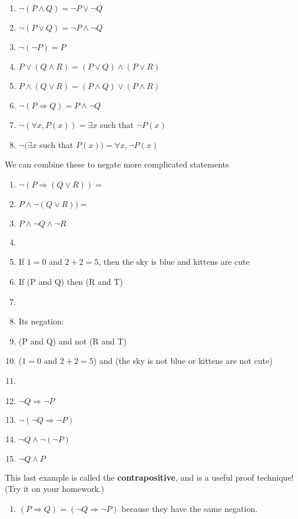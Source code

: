 \documentclass[12pt, reqno]{amsart}
\begin{document}
\begin{enumerate}
\item $\neg(P \wedge Q) = \neg P \vee \neg Q$
\item $\neg(P \vee Q) = \neg P \wedge \neg Q$
\item $\neg(\neg P) = P$
\item $P \vee (Q \wedge R) = (P \vee Q) \wedge (P \vee R)$
\item $P \wedge (Q \vee R) = (P \wedge Q) \vee (P \wedge R)$
\item $\neg (P \Rightarrow Q) = P \wedge \neg Q$
\item $\neg (\forall x, P(x)) = \exists x$  such that $\neg P(x)$
\item $\neg (\exists x$ such that $P(x)) = \forall x, \neg P(x)$

\end{enumerate}
\vspace{10pt}

We can combine these to negate more complicated statements

\begin{enumerate}
\item $\neg(P \Rightarrow (Q \vee R)) = $ 
\item [] $P \wedge \neg (Q \vee R)) = $ 
\item [] $P \wedge \neg Q \wedge \neg R$ 
\item []
\item If $1 = 0$ and $2 + 2 = 5$, then the sky is blue and kittens are cute
\item [] If (P and Q) then (R and T)
\item [] 
\item [] Its negation:
\item [] (P and Q) and not (R and T)
\item [] ($1 = 0$ and $2 + 2  = 5$) and (the sky is not blue or kittens are not cute)
\item []
\item $\neg Q \Rightarrow \neg P$
\item [] $\neg (\neg Q \Rightarrow \neg P)$
\item [] $\neg Q \wedge \neg(\neg P)$
\item [] $\neg Q \wedge P$
\end{enumerate}

\vspace{10pt}

This last example is called the \textbf{contrapositive}, and is a useful proof technique! (Try it on your homework.)
\\

\begin{enumerate}
\item[] $(P \Rightarrow Q) = (\neg Q \Rightarrow \neg P)$ because they have the same negation.
\end{enumerate}
\end{document}
